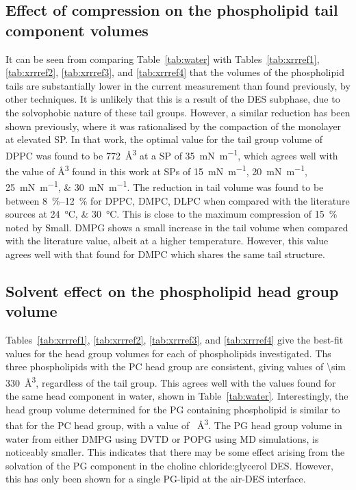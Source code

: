 \subsection{Effect of compression on the phospholipid tail component volumes}
It can be seen from comparing Table~\ref{tab:water} with Tables~\ref{tab:xrrref1}, \ref{tab:xrrref2}, \ref{tab:xrrref3}, and \ref{tab:xrrref4} that the volumes of the phospholipid tails are substantially lower in the current measurement than found previously, by other techniques.
It is unlikely that this is a result of the DES subphase, due to the solvophobic nature of these tail groups.
However, a similar reduction has been shown previously,\autocite{campbell_structure_2018} where it was rationalised by the compaction of the monolayer at elevated SP.
In that work, the optimal value for the tail group volume of DPPC was found to be \SI{772}{\angstrom\cubed} at a SP of \SI{35}{\milli\newton\per\meter}, which agrees well with the value of \si{\angstrom\cubed} found in this work at SPs of \SIlist{15;20;25;30}{\milli\newton\per\meter}.
The reduction in tail volume was found to be between \SIrange{8}{12}{\percent} for DPPC, DMPC, DLPC when compared with the literature sources at \SIlist{24;30}{\celsius}.
This is close to the maximum compression of \SI{15}{\percent} noted by Small.\autocite{small_lateral_1984}
DMPG shows a small increase in the tail volume when compared with the literature value, albeit at a higher temperature.
However, this value agrees well with that found for DMPC which shares the same tail structure.

\subsection{Solvent effect on the phospholipid head group volume}
Tables~\ref{tab:xrrref1}, \ref{tab:xrrref2}, \ref{tab:xrrref3}, and \ref{tab:xrrref4} give the best-fit values for the head group volumes for each of phospholipids investigated.
Ths three phospholipids with the PC head group are consistent, giving values of \SI{\sim 330}{\angstrom\cubed}, regardless of the tail group.
This agrees well with the values found for the same head component in water, shown in Table~\ref{tab:water}.
Interestingly, the head group volume determined for the PG containing phospholipid is similar to that for the PC head group, with a value of ~\si{\angstrom\cubed}.
The PG head group volume in water from either DMPG using DVTD\autocite{pan_molecular_2012} or POPG using MD simulations,\autocite{kucerka_scattering_2012} is noticeably smaller.
This indicates that there may be some effect arising from the solvation of the PG component in the choline chloride:glycerol DES.
However, this has only been shown for a single PG-lipid at the air-DES interface.


